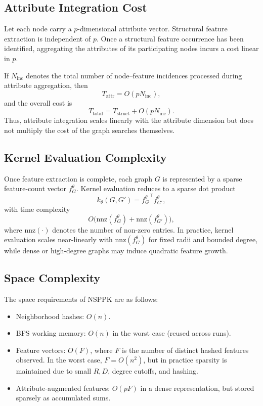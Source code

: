 \subsection{Attribute Integration Cost}

Let each node carry a $p$-dimensional attribute vector. Structural feature
extraction is independent of $p$. Once a structural feature occurrence has
been identified, aggregating the attributes of its participating nodes incurs
a cost linear in $p$.

If $N_{\mathrm{inc}}$ denotes the total number of node--feature incidences
processed during attribute aggregation, then
\[
T_{\mathrm{attr}}=O(pN_{\mathrm{inc}}),
\]
and the overall cost is
\[
T_{\mathrm{total}}
=
T_{\mathrm{struct}}+O(pN_{\mathrm{inc}}).
\]
Thus, attribute integration scales linearly with the attribute dimension but
does not multiply the cost of the graph searches themselves.

\subsection{Kernel Evaluation Complexity}

Once feature extraction is complete, each graph $G$ is represented by a sparse feature-count vector $f_G^\theta$.  
Kernel evaluation reduces to a sparse dot product
\[
k_\theta(G,G') = {f_G^\theta}^{\top}f_{G'}^\theta,
\]
with time complexity
\[
O\bigl(\mathrm{nnz}(f_G^\theta) + \mathrm{nnz}(f_{G'}^\theta)\bigr),
\]
where $\mathrm{nnz}(\cdot)$ denotes the number of non-zero entries.  
In practice, kernel evaluation scales near-linearly with
$\mathrm{nnz}(f_G^\theta)$ for fixed radii and bounded degree, while dense or high-degree graphs may induce quadratic feature growth.


\subsection{Space Complexity}

The space requirements of NSPPK are as follows:
\begin{itemize}
\item Neighborhood hashes: $O(n)$.
\item BFS working memory: $O(n)$ in the worst case (reused across runs).
\item Feature vectors: $O(F)$, where $F$ is the number of distinct hashed features observed.  
In the worst case, $F=O(n^2)$, but in practice sparsity is maintained due to small $R,D$, degree cutoffs, and hashing.
\item Attribute-augmented features: $O(pF)$ in a dense representation, but stored sparsely as accumulated sums.
\end{itemize}

